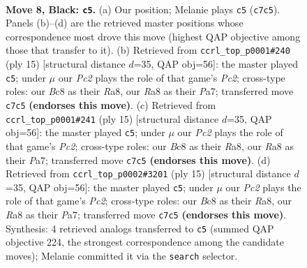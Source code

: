 \documentclass[11pt]{article}
\begin{document}
\begin{figure}[p]\centering
\begin{subfigure}{0.46\textwidth}\centering
\resizebox{\linewidth}{!}{%
\newchessgame
\chessboard[
  setfen={rnbq1rk1/ppp1ppbp/6p1/6B1/3PP3/2P5/P2K1PPP/R2Q1BNR b - - 4 8},
  showmover=false,
  pgfstyle=straightmove, color=movearrow, markmove={c7-c5}
]}
\caption{}
\end{subfigure}\hfill
\begin{subfigure}{0.46\textwidth}\centering
\resizebox{\linewidth}{!}{%
\newchessgame
\chessboard[
  setfen={rnbq1rk1/ppp1ppbp/6p1/8/3PP2P/2B5/PP3PP1/R2QKBNR b KQ - 0 8},
  showmover=false,
  pgfstyle=straightmove, color=movearrow, markmove={c7-c5}
]}
\caption{}
\end{subfigure}
\\[4pt]
\begin{subfigure}{0.46\textwidth}\centering
\resizebox{\linewidth}{!}{%
\newchessgame
\chessboard[
  setfen={rnbq1rk1/ppp1ppbp/6p1/8/3PP2P/2B5/PP3PP1/R2QKBNR b KQ - 0 8},
  showmover=false,
  pgfstyle=straightmove, color=movearrow, markmove={c7-c5}
]}
\caption{}
\end{subfigure}\hfill
\begin{subfigure}{0.46\textwidth}\centering
\resizebox{\linewidth}{!}{%
\newchessgame
\chessboard[
  setfen={rnbq1rk1/ppp1ppbp/6p1/8/3PP2P/2B5/PP3PP1/R2QKBNR b KQ - 0 8},
  showmover=false,
  pgfstyle=straightmove, color=movearrow, markmove={c7-c5}
]}
\caption{}
\end{subfigure}
\caption{\textbf{Move 8, Black: \texttt{c5}.} (a) Our position; Melanie plays \texttt{c5} (\texttt{c7c5}). Panels (b)--(d) are the retrieved master positions whose correspondence most drove this move (highest QAP objective among those that transfer to it). (b) Retrieved from \texttt{ccrl\_top\_p0001\#240} (ply 15) [structural distance $d$=35, QAP obj=56]: the master played \texttt{c5}; under $\mu$ our \emph{Pc2} plays the role of that game's \emph{Pc2}; cross-type roles: our \emph{B}c8 as their \emph{R}a8, our \emph{R}a8 as their \emph{P}a7; transferred move \texttt{c7c5} \textbf{(endorses this move)}. (c) Retrieved from \texttt{ccrl\_top\_p0001\#241} (ply 15) [structural distance $d$=35, QAP obj=56]: the master played \texttt{c5}; under $\mu$ our \emph{Pc2} plays the role of that game's \emph{Pc2}; cross-type roles: our \emph{B}c8 as their \emph{R}a8, our \emph{R}a8 as their \emph{P}a7; transferred move \texttt{c7c5} \textbf{(endorses this move)}. (d) Retrieved from \texttt{ccrl\_top\_p0002\#3201} (ply 15) [structural distance $d$=35, QAP obj=56]: the master played \texttt{c5}; under $\mu$ our \emph{Pc2} plays the role of that game's \emph{Pc2}; cross-type roles: our \emph{B}c8 as their \emph{R}a8, our \emph{R}a8 as their \emph{P}a7; transferred move \texttt{c7c5} \textbf{(endorses this move)}. Synthesis: 4 retrieved analogs transferred to \texttt{c5} (summed QAP objective 224, the strongest correspondence among the candidate moves); Melanie committed it via the \texttt{search} selector.}
\label{fig:thought-m15}
\end{figure}
\end{document}
